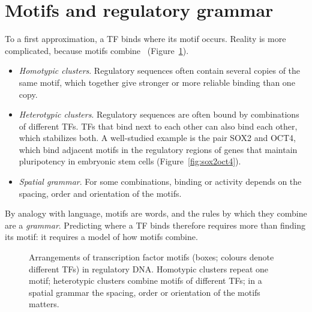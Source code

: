 \section{Motifs and regulatory grammar}
\label{sec:grammar}

To a first approximation, a TF binds where its motif occurs. Reality is more complicated, because motifs combine~\citep{spitz2012} (Figure~\ref{fig:grammar}).
\begin{itemize}
  \item \emph{Homotypic clusters}. Regulatory sequences often contain several copies of the same motif, which together give stronger or more reliable binding than one copy.
  \item \emph{Heterotypic clusters}. Regulatory sequences are often bound by combinations of different TFs. TFs that bind next to each other can also bind each other, which stabilizes both. A well-studied example is the pair SOX2 and OCT4, which bind adjacent motifs in the regulatory regions of genes that maintain pluripotency in embryonic stem cells (Figure~\ref{fig:sox2oct4}).
  \item \emph{Spatial grammar}. For some combinations, binding or activity depends on the spacing, order and orientation of the motifs.
\end{itemize}
By analogy with language, motifs are words, and the rules by which they combine are a \emph{grammar}. Predicting where a TF binds therefore requires more than finding its motif: it requires a model of how motifs combine.

\begin{figure}[t]
  \centering
  \caption{Arrangements of transcription factor motifs (boxes; colours denote different TFs) in regulatory DNA. Homotypic clusters repeat one motif; heterotypic clusters combine motifs of different TFs; in a spatial grammar the spacing, order or orientation of the motifs matters.}
  \label{fig:grammar}
\end{figure}

